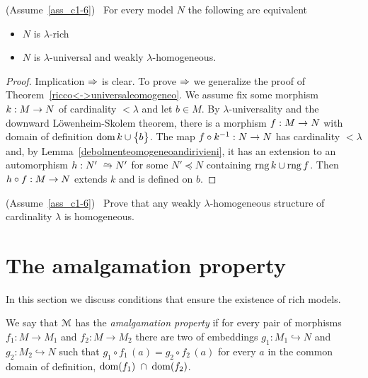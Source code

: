 \begin{theorem}\label{ricco=universaledebolmenteomogeneo}
(Assume~\ref{ass_c1-6})  \  For every model $N$ the following are equivalent
\begin{itemize}
\item[1.] $N$ is $\lambda$-rich
\item[2.] $N$ is $\lambda$-universal and weakly $\lambda$-homogeneous.
\end{itemize}
\end{theorem}

\begin{proof} 
Implication $\Rightarrow$ is clear.
To prove $\Rightarrow$ we generalize the proof of Theorem~\ref{ricco<->universaleomogeneo}.
We assume  fix some morphism $k:M\rightarrow N$ of cardinality $<\lambda$ and let $b\in M$.
By $\lambda$-universality and the downward L\"owenheim-Skolem theorem, there is a morphism $f:M\rightarrow N$ with domain of definition $\mathop{\rm dom} k\cup\big\{b\big\}$.
The map $f\circ k^{-1}:N\rightarrow N$ has cardinality $<\lambda$ and, by Lemma~\ref{debolmenteomogeneoandirivieni}, it has an extension to an automorphism $h:N'\isomap N'$ for some $N'\preceq N$ containing $\mathop{\rm rng} k\cup\mathop{\rm rng} f$.
Then $h\circ f:M\rightarrow N$ extends $k$ and is defined on $b$.
\end{proof}


\begin{exercise}\label{omogeneo=debolmenteaomogeneo}
  (Assume~\ref{ass_c1-6}) \ Prove that any weakly $\lambda$-ho\-mo\-ge\-ne\-ous structure of cardinality $\lambda$ is homogeneous.
  \end{exercise}
  
\section{The amalgamation property}\label{amalgamation}

In this section we discuss conditions that ensure the existence of rich models.

We say that $\EuScript M$ has the \emph{amalgamation property\/} if for every pair of morphisms $f_1:M\to M_1$ and $f_2:M\to M_2$ there are two of embeddings $g_1:M_1\hookrightarrow N$ and $g_2:M_2\hookrightarrow N$ such that $g_1\circ f_1\, (a) = g_2\circ f_2\, (a)$ for every $a$ in the common domain of definition, $\mathop{\rm dom} (f_1)\; \cap\; \mathop{\rm dom} (f_2)$.


